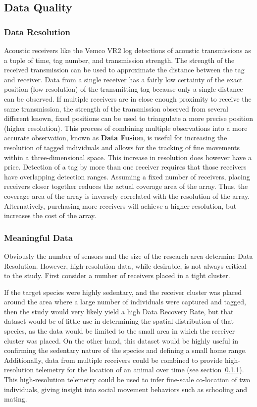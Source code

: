 \subsection{Data Quality}
\label{dataQuality}

\subsubsection{Data Resolution}
\label{dataResolution}
\label{dataFusion}
Acoustic receivers like the Vemco VR2 log detections of acoustic transmissions as a tuple of time, tag number, and transmission strength.  The strength of the received transmission can be used to approximate the distance between the tag and receiver.  Data from a single receiver has a fairly low certainty of the exact position (low resolution) of the transmitting tag because only a single distance can be observed.  If multiple receivers are in close enough proximity to receive the same transmission, the strength of the transmission observed from several different known, fixed positions can be used to triangulate a more precise position (higher resolution).  This process of combining multiple observations into a more accurate observation, known as \textbf{Data Fusion}, is useful for increasing the resolution of tagged individuals and allows for the tracking of fine movements within a three-dimensional space.  This increase in resolution does however have a price.  Detection of a tag by more than one receiver requires that those receivers have overlapping detection ranges.  Assuming a fixed number of receivers, placing receivers closer together reduces the actual coverage area of the array.  Thus, the coverage area of the array is inversely correlated with the resolution of the array.  Alternatively, purchasing more receivers will achieve a higher resolution, but increases the cost of the array.


\subsubsection{Meaningful Data}
\label{meaningfulData}
Obviously the number of sensors and the size of the research area determine Data Resolution.  However, high-resolution data, while desirable, is not always critical to the study.  First consider a number of receivers placed in a tight cluster.

If the target species were highly sedentary, and the receiver cluster was placed around the area where a large number of individuals were captured and tagged, then the study would very likely yield a high Data Recovery Rate, but that dataset would be of little use in determining the spatial distribution of that species, as the data would be limited to the small area in which the receiver cluster was placed.  On the other hand, this dataset would be highly useful in confirming the sedentary nature of the species and defining a small home range.  Additionally, data from multiple receivers could be combined to provide high-resolution telemetry for the location of an animal over time (see section~\ref{dataResolution}).  This high-resolution telemetry could be used to infer fine-scale co-location of two individuals, giving insight into social movement behaviors such as schooling and mating.  

